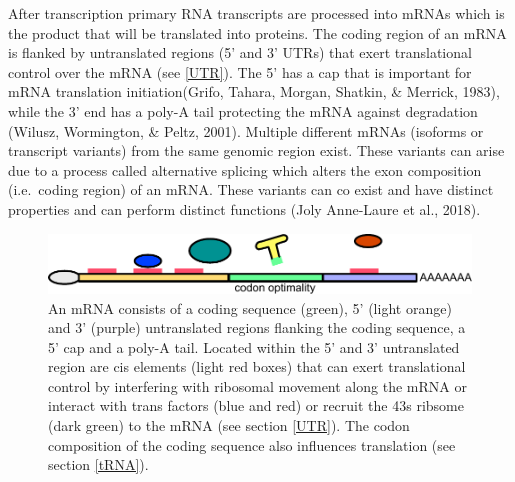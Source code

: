 \documentclass[12pt,openany]{book}
\begin{document}
After transcription primary RNA transcripts are processed into mRNAs
which is the product that will be translated into proteins. The coding
region of an mRNA is flanked by untranslated regions (5' and 3' UTRs)
that exert translational control over the mRNA (see \ref{UTR}). The 5'
has a cap that is important for mRNA translation initiation(Grifo,
Tahara, Morgan, Shatkin, \& Merrick, 1983), while the 3' end has a
poly-A tail protecting the mRNA against degradation (Wilusz, Wormington,
\& Peltz, 2001). Multiple different mRNAs (isoforms or transcript
variants) from the same genomic region exist. These variants can arise
due to a process called alternative splicing which alters the exon
composition (i.e.~coding region) of an mRNA. These variants can co exist
and have distinct properties and can perform distinct functions (Joly
Anne-Laure et al., 2018).

\begin{figure}
  \includegraphics{./figures/UTRFeatures.pdf}
  \caption{ An mRNA consists of a coding sequence (green), 5' (light orange) and 3' (purple) untranslated regions flanking the coding sequence, a 5' cap and a poly-A tail. Located within the 5' and 3' untranslated region are cis elements (light red boxes) that can exert translational control by interfering with ribosomal movement along the mRNA or interact with trans factors (blue and red) or recruit the 43s ribsome (dark green) to the mRNA (see section \ref{UTR}). The codon composition of the coding sequence also influences translation (see section \ref{tRNA}).   
 \label{fig:UTRFeat}}
\end{figure}

\clearpage
\end{document}
